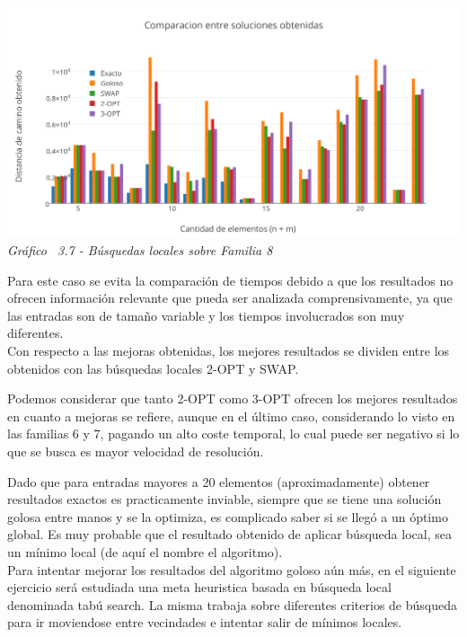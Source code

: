 \vspace*{0.3cm} \vspace*{0.3cm}
  \begin{center}
 \includegraphics[scale=0.5]{./EJ3/comparacionbusquedaslocalessolucionrandom.png}\\
 {            \textit{Gráfico \ 3.7 - Búsquedas locales sobre Familia 8}}
  \end{center}
  \vspace*{0.3cm}
 
Para este caso se evita la comparación de tiempos debido a que los resultados no ofrecen información relevante que pueda ser analizada comprensivamente, ya que las entradas son de tamaño variable y los tiempos involucrados son muy diferentes.\\

Con respecto a las mejoras obtenidas, los mejores resultados se dividen entre los obtenidos con las búsquedas locales 2-OPT y SWAP.

Podemos considerar que tanto 2-OPT como 3-OPT ofrecen los mejores resultados en cuanto a mejoras se refiere, aunque en el último caso, considerando lo visto en las familias 6 y 7, pagando un alto coste temporal, lo cual puede ser negativo si lo que se busca es mayor velocidad de resolución.

Dado que para entradas mayores a 20 elementos (aproximadamente) obtener resultados exactos es practicamente inviable, siempre que se tiene una solución golosa entre manos y se la optimiza, es complicado saber si se llegó a un óptimo global. Es muy probable que el resultado obtenido de aplicar búsqueda local, sea un mínimo local (de aquí el nombre el algoritmo).\\
Para intentar mejorar los resultados del algoritmo goloso aún más, en el siguiente ejercicio será estudiada una meta heuristica basada en búsqueda local denominada tabú search. La misma trabaja sobre diferentes criterios de búsqueda para ir moviendose entre vecindades e intentar salir de mínimos locales.\\

